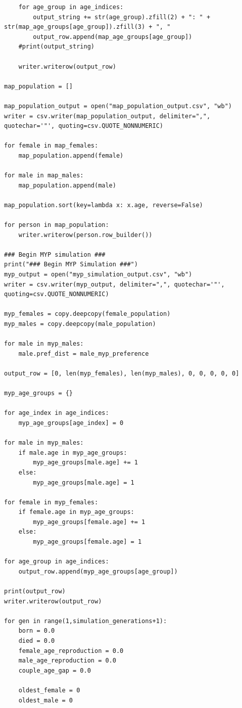 \documentclass[authoryearcitations]{UoYCSproject}
\begin{document}
\begin{landscape}
\begin{verbatim}
    for age_group in age_indices:
        output_string += str(age_group).zfill(2) + ": " +  str(map_age_groups[age_group]).zfill(3) + ", "
        output_row.append(map_age_groups[age_group])
    #print(output_string)

    writer.writerow(output_row)

map_population = []

map_population_output = open("map_population_output.csv", "wb")
writer = csv.writer(map_population_output, delimiter=",", quotechar='"', quoting=csv.QUOTE_NONNUMERIC)

for female in map_females:
    map_population.append(female)

for male in map_males:
    map_population.append(male)

map_population.sort(key=lambda x: x.age, reverse=False)

for person in map_population:
    writer.writerow(person.row_builder())

### Begin MYP simulation ###
print("### Begin MYP Simulation ###")
myp_output = open("myp_simulation_output.csv", "wb")
writer = csv.writer(myp_output, delimiter=",", quotechar='"', quoting=csv.QUOTE_NONNUMERIC)

myp_females = copy.deepcopy(female_population)
myp_males = copy.deepcopy(male_population)

for male in myp_males:
    male.pref_dist = male_myp_preference

output_row = [0, len(myp_females), len(myp_males), 0, 0, 0, 0, 0]

myp_age_groups = {}

for age_index in age_indices:
    myp_age_groups[age_index] = 0

for male in myp_males:
    if male.age in myp_age_groups:
        myp_age_groups[male.age] += 1
    else:
        myp_age_groups[male.age] = 1

for female in myp_females:
    if female.age in myp_age_groups:
        myp_age_groups[female.age] += 1
    else:
        myp_age_groups[female.age] = 1

for age_group in age_indices:
    output_row.append(myp_age_groups[age_group])

print(output_row)
writer.writerow(output_row)

for gen in range(1,simulation_generations+1):
    born = 0.0
    died = 0.0
    female_age_reproduction = 0.0
    male_age_reproduction = 0.0
    couple_age_gap = 0.0

    oldest_female = 0
    oldest_male = 0


\end{verbatim}
\end{landscape}
\end{document}
